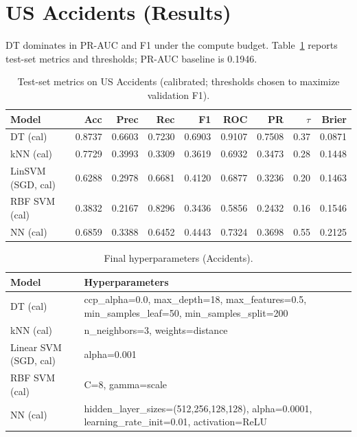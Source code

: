 \documentclass[conference]{IEEEtran}
\newcommand{\datasetB}{US Accidents}
\begin{document}
\section{\datasetB{} (Results)}
DT dominates in PR-AUC and F1 under the compute budget. Table~\ref{tab:accidents-metrics} reports test-set metrics and thresholds; PR-AUC baseline is 0.1946.

\begin{table}[htbp]
\caption{Test-set metrics on \datasetB{} (calibrated; thresholds chosen to maximize validation F1).}
\begin{center}
\begin{tabular}{|l|r|r|r|r|r|r|r|r|}
\hline
Model & Acc & Prec & Rec & F1 & ROC & PR & $\tau$ & Brier \\
\hline
DT (cal) & 0.8737 & 0.6603 & 0.7230 & 0.6903 & 0.9107 & 0.7508 & 0.37 & 0.0871 \\
kNN (cal) & 0.7729 & 0.3993 & 0.3309 & 0.3619 & 0.6932 & 0.3473 & 0.28 & 0.1448 \\
LinSVM (SGD, cal) & 0.6288 & 0.2978 & 0.6681 & 0.4120 & 0.6877 & 0.3236 & 0.20 & 0.1463 \\
RBF SVM (cal) & 0.3832 & 0.2167 & 0.8296 & 0.3436 & 0.5856 & 0.2432 & 0.16 & 0.1546 \\
NN (cal) & 0.6859 & 0.3388 & 0.6452 & 0.4443 & 0.7324 & 0.3698 & 0.55 & 0.2125 \\
\hline
\end{tabular}
\label{tab:accidents-metrics}
\end{center}
\end{table}

\begin{table}[htbp]
\caption{Final hyperparameters (Accidents).}
\begin{center}
\begin{tabular}{|l|l|}
\hline
Model & Hyperparameters \\
\hline
DT (cal) & ccp\_alpha=0.0, max\_depth=18, max\_features=0.5, min\_samples\_leaf=50, min\_samples\_split=200 \\
 kNN (cal) & n\_neighbors=3, weights=distance \\
 Linear SVM (SGD, cal) & alpha=0.001 \\
 RBF SVM (cal) & C=8, gamma=scale \\
 NN (cal) & hidden\_layer\_sizes=(512,256,128,128), alpha=0.0001, learning\_rate\_init=0.01, activation=ReLU \\
\hline
\end{tabular}
\end{center}
\end{table}
\end{document}
